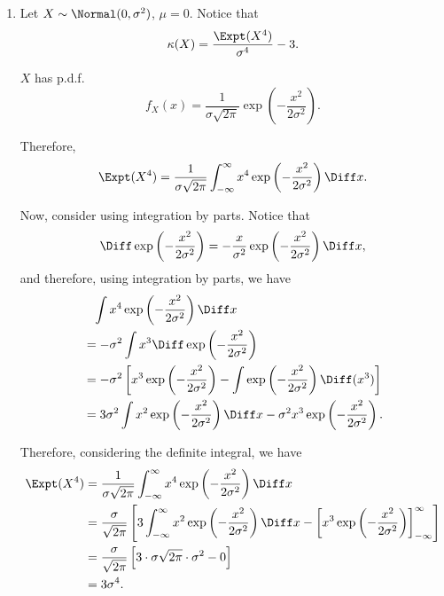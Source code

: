 \begin{enumerate}
    \item Let \(X \sim \Normal(0, \sigma^2)\), \(\mu = 0\).
          Notice that
          \begin{align*}
              \kappa(X) = \frac{\Expt(X^4)}{\sigma^4} - 3.
          \end{align*}

          \(X\) has p.d.f.
          \[
              f_X(x) = \frac{1}{\sigma\sqrt{2\pi}}\exp\left(-\frac{x^2}{2\sigma^2}\right).
          \]

          Therefore,
          \[
              \Expt(X^4) = \frac{1}{\sigma\sqrt{2\pi}} \int_{-\infty}^{\infty} x^4 \exp\left(-\frac{x^2}{2\sigma^2}\right) \Diff x.
          \]

          Now, consider using integration by parts. Notice that
          \[
              \Diff \exp\left(-\frac{x^2}{2\sigma^2}\right) = - \frac{x}{\sigma^2} \exp\left(-\frac{x^2}{2\sigma^2}\right) \Diff x,
          \]
          and therefore, using integration by parts, we have
          \begin{align*}
               & \phantom{=} \int x^4 \exp\left(-\frac{x^2}{2\sigma^2}\right) \Diff x                                                               \\
               & = - \sigma^2 \int x^3 \Diff \exp\left(-\frac{x^2}{2\sigma^2}\right)                                                                \\
               & = - \sigma^2 \left[ x^3 \exp\left(-\frac{x^2}{2\sigma^2}\right) - \int \exp\left(-\frac{x^2}{2\sigma^2}\right) \Diff (x^3) \right] \\
               & = 3 \sigma^2 \int x^2 \exp\left(-\frac{x^2}{2\sigma^2}\right) \Diff x - \sigma^2 x^3 \exp\left(-\frac{x^2}{2\sigma^2}\right).
          \end{align*}

          Therefore, considering the definite integral, we have
          \begin{align*}
              \Expt(X^4) & = \frac{1}{\sigma\sqrt{2\pi}} \int_{-\infty}^{\infty} x^4 \exp\left(-\frac{x^2}{2\sigma^2}\right) \Diff x                                                                                                \\
                         & = \frac{\sigma}{\sqrt{2\pi}} \left[3 \int_{-\infty}^{\infty} x^2 \exp \left(- \frac{x^2}{2\sigma^2}\right)\Diff x - \left[x^3 \exp\left(- \frac{x^2}{2 \sigma^2}\right)\right]^{\infty}_{-\infty}\right] \\
                         & = \frac{\sigma}{\sqrt{2\pi}} \left[3 \cdot \sigma \sqrt{2\pi} \cdot \sigma^2 - 0\right]                                                                                                                  \\
                         & = 3 \sigma^4.
          \end{align*}


\end{enumerate}

